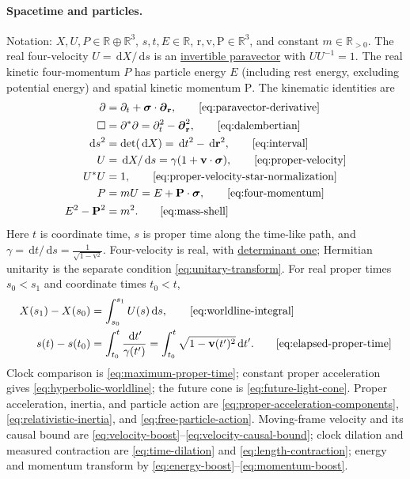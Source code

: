 \documentclass[11pt]{article}
\newcommand{\pv}[1]{{#1}}
\newcommand{\pvGreek}[1]{{#1}}
\newcommand{\vstyle}[1]{{\bm{\mathrm{#1}}}}
\newcommand{\pP}{\pv{P}}
\newcommand{\pU}{\pv{U}}
\newcommand{\pX}{\pv{X}}
\newcommand{\pvpartial}{\pvGreek{\partial}}
\numberwithin{equation}{section}
\newcommand{\R}{\mathbb{R}}
\newcommand{\dotprod}{\cdot}
\newcommand{\bsig}{\vstyle{\sigma}}
\newcommand{\br}{\vstyle{r}}
\newcommand{\bv}{\vstyle{v}}
\newcommand{\bp}{\vstyle{P}}
\newcommand{\pdr}{\vstyle{\partial}_{\br}}
\newcommand{\dd}{\,\mathrm d}
\begin{document}
\paragraph{Spacetime and particles.}
Notation: $\pX,\pU,\pP\in\R\oplus\R^3$, $s,t,E\in\R$,
$\br,\bv,\bp\in\R^3$, and constant $m\in\R_{>0}$.  The real four-velocity $\pU=\dd \pX/\dd s$ is an
\hyperref[eq:unit-paravector]{invertible paravector} with $\pU \pU^{-1}=1$.
The real kinetic four-momentum $\pP$ has particle energy $E$ (including
rest energy, excluding potential energy) and spatial kinetic momentum $\bp$.
The kinematic identities are
\begin{align*}
 \pvpartial&=\partial_t+\bsig\dotprod\pdr,
   \tag*{\eqref{eq:paravector-derivative}}\\
 \Box&=\pvpartial^*\pvpartial=\partial_t^2-\pdr^2,
   \tag*{\eqref{eq:dalembertian}}\\
 \dd s^2&=\det(\dd \pX)=\dd t^2-\dd\br^2,
   \tag*{\eqref{eq:interval}}\\
 \pU&=\dd \pX/\dd s=\gamma(1+\bv\dotprod\bsig),
   \tag*{\eqref{eq:proper-velocity}}\\
 \pU^*\pU&=1,
   \tag*{\eqref{eq:proper-velocity-star-normalization}}\\
 \pP&=m\pU=E+\bp\dotprod\bsig,
   \tag*{\eqref{eq:four-momentum}}\\
 E^2-\bp^2&=m^2.
   \tag*{\eqref{eq:mass-shell}}
\end{align*}
Here $t$ is coordinate time, $s$ is proper time along the time-like path,
and $\gamma=\dd t/\dd s=\frac{1}{\sqrt{1-\bv^2}}$. Four-velocity is real,
with \hyperref[eq:unit-determinant-paravector]{determinant one}; Hermitian unitarity is the separate condition
\eqref{eq:unitary-transform}.
For real proper times $s_0<s_1$ and coordinate times $t_0<t$,
\begin{align*}
 \pX(s_1)-\pX(s_0)&=\int_{s_0}^{s_1}\pU(s)\dd s,
   \tag*{\eqref{eq:worldline-integral}}\\
 s(t)-s(t_0)&=\int_{t_0}^{t}\frac{\dd t'}{\gamma(t')}
 =\int_{t_0}^{t}\sqrt{1-\bv(t')^2}\dd t'.
   \tag*{\eqref{eq:elapsed-proper-time}}
\end{align*}
Clock comparison is \eqref{eq:maximum-proper-time}; constant proper
acceleration gives \eqref{eq:hyperbolic-worldline}; the future cone is
\eqref{eq:future-light-cone}.  Proper acceleration, inertia, and particle
action are \eqref{eq:proper-acceleration-components},
\eqref{eq:relativistic-inertia}, and \eqref{eq:free-particle-action}.
Moving-frame velocity and its causal bound are
\eqref{eq:velocity-boost}--\eqref{eq:velocity-causal-bound}; clock dilation
and measured contraction are \eqref{eq:time-dilation} and
\eqref{eq:length-contraction}; energy and momentum transform by
\eqref{eq:energy-boost}--\eqref{eq:momentum-boost}.
\end{document}
